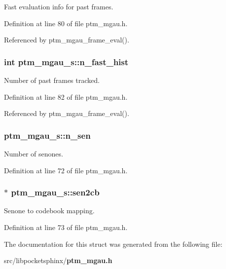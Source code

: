 \-Fast evaluation info for past frames. 



\-Definition at line 80 of file ptm\-\_\-mgau.\-h.



\-Referenced by ptm\-\_\-mgau\-\_\-frame\-\_\-eval().

\subsubsection[{n\-\_\-fast\-\_\-hist}]{\setlength{\rightskip}{0pt plus 5cm}int {\bf ptm\-\_\-mgau\-\_\-s\-::n\-\_\-fast\-\_\-hist}}\label{structptm__mgau__s_ac491c223199ed5374dfb13fc41854601}


\-Number of past frames tracked. 



\-Definition at line 82 of file ptm\-\_\-mgau.\-h.



\-Referenced by ptm\-\_\-mgau\-\_\-frame\-\_\-eval().

\subsubsection[{n\-\_\-sen}]{ {\bf ptm\-\_\-mgau\-\_\-s\-::n\-\_\-sen}}\label{structptm__mgau__s_ab0f6c452efe082383e906ac2a4f75de4}


\-Number of senones. 



\-Definition at line 72 of file ptm\-\_\-mgau.\-h.

\subsubsection[{sen2cb}]{$\ast$ {\bf ptm\-\_\-mgau\-\_\-s\-::sen2cb}}\label{structptm__mgau__s_a5e677255165b8abda63dd1d6dbed1be7}


\-Senone to codebook mapping. 



\-Definition at line 73 of file ptm\-\_\-mgau.\-h.



\-The documentation for this struct was generated from the following file\-:\begin{DoxyCompactItemize}
\item 
src/libpocketsphinx/{\bf ptm\-\_\-mgau.\-h}\end{DoxyCompactItemize}
